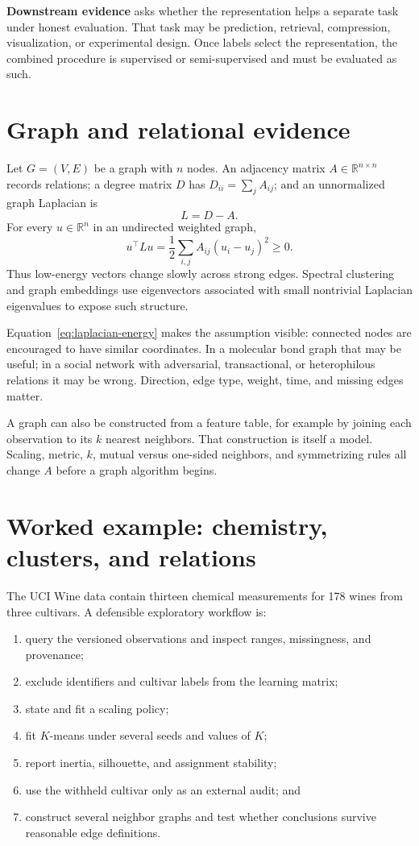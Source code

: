 \textbf{Downstream evidence} asks whether the representation helps a separate
task under honest evaluation. That task may be prediction, retrieval,
compression, visualization, or experimental design. Once labels select the
representation, the combined procedure is supervised or semi-supervised and
must be evaluated as such.

\section{Graph and relational evidence}

Let $G=(V,E)$ be a graph with $n$ nodes. An adjacency matrix $A\in\mathbb{R}^{n
\times n}$ records relations; a degree matrix $D$ has
$D_{ii}=\sum_j A_{ij}$; and an unnormalized graph Laplacian is
\[
L=D-A.
\]
For every $u\in\mathbb{R}^n$ in an undirected weighted graph,
\begin{equation}
\label{eq:laplacian-energy}
u^\top Lu=\frac12\sum_{i,j}A_{ij}(u_i-u_j)^2\ge 0.
\end{equation}
Thus low-energy vectors change slowly across strong edges. Spectral clustering
and graph embeddings use eigenvectors associated with small nontrivial
Laplacian eigenvalues to expose such structure.

Equation~\eqref{eq:laplacian-energy} makes the assumption visible: connected
nodes are encouraged to have similar coordinates. In a molecular bond graph
that may be useful; in a social network with adversarial, transactional, or
heterophilous relations it may be wrong. Direction, edge type, weight, time,
and missing edges matter.

A graph can also be constructed from a feature table, for example by joining
each observation to its $k$ nearest neighbors. That construction is itself a
model. Scaling, metric, $k$, mutual versus one-sided neighbors, and symmetrizing
rules all change $A$ before a graph algorithm begins.

\section{Worked example: chemistry, clusters, and relations}

The UCI Wine data contain thirteen chemical measurements for 178 wines from
three cultivars. A defensible exploratory workflow is:
\begin{enumerate}
  \item query the versioned observations and inspect ranges, missingness, and provenance;
  \item exclude identifiers and cultivar labels from the learning matrix;
  \item state and fit a scaling policy;
  \item fit $K$-means under several seeds and values of $K$;
  \item report inertia, silhouette, and assignment stability;
  \item use the withheld cultivar only as an external audit; and
  \item construct several neighbor graphs and test whether conclusions survive
  reasonable edge definitions.
\end{enumerate}

